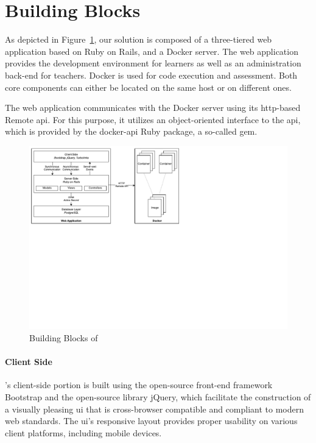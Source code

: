 \section{Building Blocks}\label{section:building-blocks}

As depicted in Figure~\ref{figure:building-blocks}, our solution is composed of a three-tiered web application based on Ruby on Rails, and a Docker server. The web application provides the development environment for learners as well as an administration back-end for teachers. Docker is used for code execution and assessment. Both core components can either be located on the same host or on different ones.

The web application communicates with the Docker server using its \gls{http}-based Remote \gls{api}. For this purpose, it utilizes an object-oriented interface to the \gls{api}, which is provided by the docker-api Ruby package, a so-called gem.

\begin{figure}
\centering
\includegraphics[clip=true, trim=0.1cm 9.2cm 9.4cm 0.2cm, width=\textwidth]{images/building-blocks.pdf}
\caption{Building Blocks of \tool}
\label{figure:building-blocks}
\end{figure}

\paragraph{Client Side}

\tool's client-side portion is built using the open-source front-end framework Bootstrap and the open-source library jQuery, which facilitate the construction of a visually pleasing \gls{ui} that is cross-browser compatible and compliant to modern web standards. The \gls{ui}'s responsive layout provides proper usability on various client platforms, including mobile devices.


